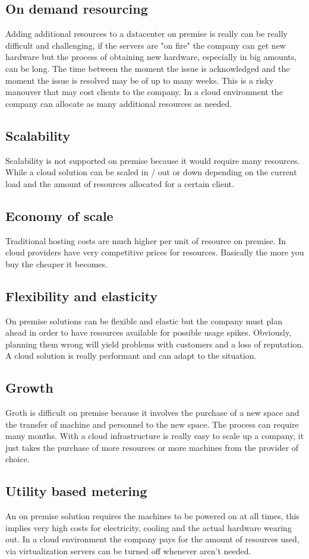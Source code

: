 \subsection{On demand resourcing}
Adding additional resources to a datacenter on premise is really can be really difficult and challenging, if the servers are "on fire" the company can get new hardware but the process of obtaining new hardware, especially in big amounts, can be long. The time between the moment the issue is acknowledged and the moment the issue is resolved may be of up to many weeks. \n
This is a risky manouver that may cost clients to the company. In a cloud environment the company can allocate as many additional resources as needed.
\subsection{Scalability}
Scalability is not supported on premise because it would require many resources. While a cloud solution can be scaled in / out or down depending on the current load and the amount of resources allocated for a certain client.
\subsection{Economy of scale}
Traditional hosting costs are much higher per unit of resource on premise. In cloud providers have very competitive prices for resources. Basically the more you buy the cheaper it becomes.
\subsection{Flexibility and elasticity}
On premise solutions can be flexible and elastic but the company must plan ahead in order to have resources available for possible usage spikes. Obviously, planning them wrong will yield problems with customers and a loss of reputation. \n
A cloud solution is really performant and can adapt to the situation.
\subsection{Growth}
Groth is difficult on premise because it involves the purchase of a new space and the transfer of machine and personnel to the new space. The process can require many months. With a cloud infrastructure is really easy to scale up a company, it just takes the purchase of more resources or more machines from the provider of choice.
\subsection{Utility based metering}
An on premise solution requires the machines to be powered on at all times, this implies very high costs for electricity, cooling and the actual hardware wearing out. \n
In a cloud environment the company pays for the amount of resources used, via virtualization servers can be turned off whenever aren't needed.
